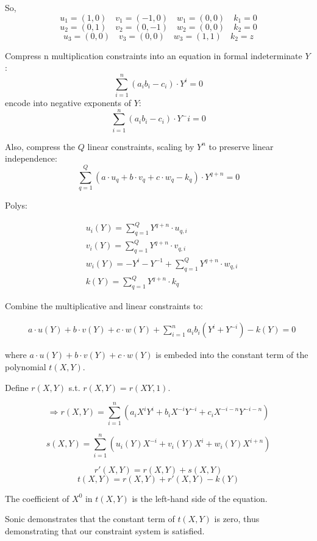 \documentclass{article}
\theoremstyle{definition}
\begin{document}
So,
$$u_1 = (1, 0) \quad v_1=(-1, 0) \quad w_1=(0, 0) \quad k_1=0$$
$$u_2 = (0, 1) \quad v_2=(0, -1) \quad w_2=(0, 0) \quad k_2=0$$
$$u_3 = (0, 0) \quad v_3=(0, 0) \quad w_3=(1, 1) \quad k_2=z$$

\vspace{1cm}

Compress n multiplication constraints into an equation in formal indeterminate $Y$:
$$\sum_{i=1}^n (a_i b_i - c_i) \cdot Y^i = 0$$
encode into negative exponents of $Y$:
$$\sum_{i=1}^n (a_i b_i - c_i) \cdot Y^-i = 0$$

Also, compress the $Q$ linear constraints, scaling by $Y^n$ to preserve linear independence:
$$
\sum_{q=1}^Q (a \cdot u_q + b \cdot v_q + c \cdot w_q - k_q) \cdot Y^{q+n} = 0
$$

Polys:

\begin{align}
\nonumber & u_i(Y) = \sum_{q=1}^Q Y^{q+n} \cdot u_{q, i}\\
\nonumber & v_i(Y) = \sum_{q=1}^Q Y^{q+n} \cdot v_{q, i}\\
\nonumber & w_i(Y) = -Y^i - Y^{-1} + \sum_{q=1}^Q Y^{q+n} \cdot w_{q, i}\\
\nonumber & k(Y) = \sum_{q=1}^Q Y^{q+n} \cdot k_q
\end{align}

Combine the multiplicative and linear constraints to:

\begin{align}
\nonumber & a \cdot u(Y) + b \cdot v(Y) + c \cdot w(Y)
+ \sum_{i=1}^n a_i b_i (Y^i + Y^{-i}) - k(Y) = 0
\end{align}

where $a \cdot u(Y) + b \cdot v(Y) + c \cdot w(Y)$ is embeded into the constant term of the polynomial $t(X, Y)$.


Define $r(X, Y)$ s.t. $r(X, Y) = r(XY, 1)$.

$$\Longrightarrow r(X, Y) = \sum_{i=1}^n (a_i X^i Y^i + b_i X^{-i} Y^{-i} + c_i X^{-i-n} Y^{-i-n})$$

$$s(X, Y) = \sum_{i=1}^n (u_i(Y) X^{-i} + v_i(Y) X^i + w_i(Y) X^{i+n})$$

$$r'(X, Y) = r(X, Y) + s(X, Y)$$
$$t(X, Y) = r(X, Y) + r'(X, Y) - k(Y)$$

The coefficient of $X^0$ in $t(X, Y)$ is the left-hand side of the equation.

Sonic demonstrates that the constant term of $t(X, Y)$ is zero, thus demonstrating that our constraint system is satisfied.
\end{document}
